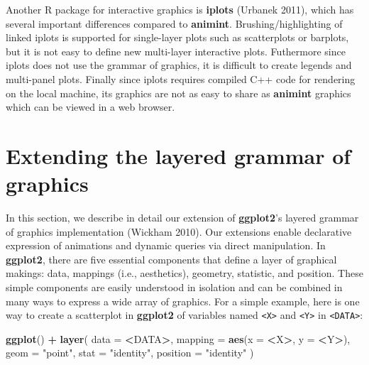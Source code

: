 \documentclass[12pt,]{article}
\newenvironment{Shaded}{\begin{snugshade}}{\end{snugshade}}
\newcommand{\DataTypeTok}[1]{\textcolor[rgb]{0.13,0.29,0.53}{#1}}
\newcommand{\KeywordTok}[1]{\textcolor[rgb]{0.13,0.29,0.53}{\textbf{#1}}}
\newcommand{\NormalTok}[1]{#1}
\newcommand{\OperatorTok}[1]{\textcolor[rgb]{0.81,0.36,0.00}{\textbf{#1}}}
\newcommand{\StringTok}[1]{\textcolor[rgb]{0.31,0.60,0.02}{#1}}
\theoremstyle{definition}
\theoremstyle{definition}
\theoremstyle{definition}
\theoremstyle{remark}
\begin{document}
Another R package for interactive graphics is \textbf{iplots} (Urbanek
2011), which has several important differences compared to
\textbf{animint}. Brushing/highlighting of linked iplots is supported
for single-layer plots such as scatterplots or barplots, but it is not
easy to define new multi-layer interactive plots. Futhermore since
iplots does not use the grammar of graphics, it is difficult to create
legends and multi-panel plots. Finally since iplots requires compiled
C++ code for rendering on the local machine, its graphics are not as
easy to share as \textbf{animint} graphics which can be viewed in a web
browser.

\hypertarget{extending-the-layered-grammar-of-graphics}{%
\section{Extending the layered grammar of
graphics}\label{extending-the-layered-grammar-of-graphics}}

In this section, we describe in detail our extension of
\textbf{ggplot2}'s layered grammar of graphics implementation (Wickham
2010). Our extensions enable declarative expression of animations and
dynamic queries via direct manipulation. In \textbf{ggplot2}, there are
five essential components that define a layer of graphical makings:
data, mappings (i.e., aesthetics), geometry, statistic, and position.
These simple components are easily understood in isolation and can be
combined in many ways to express a wide array of graphics. For a simple
example, here is one way to create a scatterplot in \textbf{ggplot2} of
variables named \texttt{\textless{}X\textgreater{}} and
\texttt{\textless{}Y\textgreater{}} in
\texttt{\textless{}DATA\textgreater{}}:

\begin{Shaded}
\begin{Highlighting}[]
\KeywordTok{ggplot}\NormalTok{() }\OperatorTok{+}\StringTok{ }\KeywordTok{layer}\NormalTok{(}
  \DataTypeTok{data =} \OperatorTok{<}\NormalTok{DATA}\OperatorTok{>}\NormalTok{, }
  \DataTypeTok{mapping =} \KeywordTok{aes}\NormalTok{(}\DataTypeTok{x =} \OperatorTok{<}\NormalTok{X}\OperatorTok{>}\NormalTok{, }\DataTypeTok{y =} \OperatorTok{<}\NormalTok{Y}\OperatorTok{>}\NormalTok{), }
  \DataTypeTok{geom =} \StringTok{"point"}\NormalTok{, }
  \DataTypeTok{stat =} \StringTok{"identity"}\NormalTok{,}
  \DataTypeTok{position =} \StringTok{"identity"}
\NormalTok{)}
\end{Highlighting}
\end{Shaded}
\end{document}

